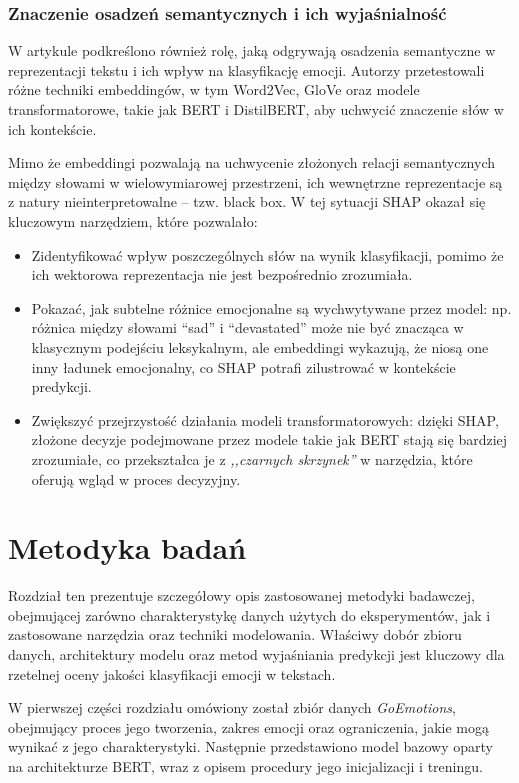 \documentclass[wmii, inf, mgr]{uwmthesis}
\begin{document}
\subsection{Znaczenie osadzeń semantycznych i ich wyjaśnialność}
W artykule podkreślono również rolę, jaką odgrywają osadzenia semantyczne w reprezentacji tekstu i ich wpływ na klasyfikację emocji. Autorzy przetestowali różne techniki embeddingów, w tym Word2Vec, GloVe oraz modele transformatorowe, takie jak BERT i DistilBERT, aby uchwycić znaczenie słów w ich kontekście.

Mimo że embeddingi pozwalają na uchwycenie złożonych relacji semantycznych między słowami w wielowymiarowej przestrzeni, ich wewnętrzne reprezentacje są z natury nieinterpretowalne -- tzw. black box. W tej sytuacji SHAP okazał się kluczowym narzędziem, które pozwalało:

\begin{itemize}
    \item {Zidentyfikować wpływ poszczególnych słów na wynik klasyfikacji, pomimo że ich wektorowa reprezentacja nie jest bezpośrednio zrozumiała.}

    \item{Pokazać, jak subtelne różnice emocjonalne są wychwytywane przez model: np. różnica między słowami “sad” i “devastated” może nie być znacząca w klasycznym podejściu leksykalnym, ale embeddingi wykazują, że niosą one inny ładunek emocjonalny, co SHAP potrafi zilustrować w kontekście predykcji.}

    \item {Zwiększyć przejrzystość działania modeli transformatorowych: dzięki SHAP, złożone decyzje podejmowane przez modele takie jak BERT stają się bardziej zrozumiałe, co przekształca je z \textit{,,czarnych skrzynek''} w narzędzia, które oferują wgląd w proces decyzyjny.}
\end{itemize}

\chapter{Metodyka badań}
Rozdział ten prezentuje szczegółowy opis zastosowanej metodyki badawczej, obejmującej zarówno charakterystykę danych użytych do eksperymentów, jak i zastosowane narzędzia oraz techniki modelowania. Właściwy dobór zbioru danych, architektury modelu oraz metod wyjaśniania predykcji jest kluczowy dla rzetelnej oceny jakości klasyfikacji emocji w tekstach.  

W pierwszej części rozdziału omówiony został zbiór danych \textit{GoEmotions}, obejmujący proces jego tworzenia, zakres emocji oraz ograniczenia, jakie mogą wynikać z jego charakterystyki. Następnie przedstawiono model bazowy oparty na architekturze BERT, wraz z opisem procedury jego inicjalizacji i treningu.  
\end{document}
